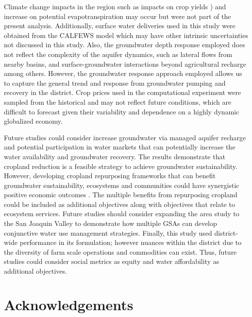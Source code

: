 \documentclass[a4paper,fleqn]{cas-sc}
\begin{document}
Climate change impacts in the region such as impacts on crop yields \citep{blanc_is_2017}) and increase on potential evapotranspiration \citep{mcevoy_projected_2020,vahmani_will_2022} may occur but were not part of the present analysis. Additionally, surface water deliveries used in this study were obtained from the CALFEWS model \citep{zeff_californias_2021} which may have other intrinsic uncertainties not discussed in this study. Also, the groundwater depth response employed does not reflect the complexity of the aquifer dynamics, such as lateral flows from nearby basins, and surface-groundwater interactions beyond agricultural recharge among others. However, the groundwater response approach employed allows us to capture the general trend and response from groundwater pumping and recovery in the district. Crop prices used in the computational experiment were sampled from the historical and may not reflect future conditions, which are difficult to forecast given their variability and dependence on a highly dynamic globalized economy. 

Future studies could consider increase groundwater via managed aquifer recharge \citep{alam_can_2020} and potential participation in water markets \citep{arellano-gonzalez_adaptive_2021,hanak_water_2019} that can potentially increase the water availability and groundwater recovery. The results demonstrate that cropland reduction is a feasible strategy to achieve groundwater sustainability. However, developing cropland repurposing frameworks that can benefit groundwater sustainability, ecosystems and communities could have synergistic positive economic outcomes \citep{biggs_landowner_2022,fernandez-bou_water_2023,espinoza_fallow_2023}. The multiple benefits from repurposing cropland could be included as additional objectives along with objectives that relate to ecosystem services. Future studies should consider expanding the area study to the San Joaquin Valley to demonstrate how multiple GSAs can develop conjunctive water use management strategies. Finally, this study used district-wide performance in its formulation; however nuances within the district due to the diversity of farm scale operations and commodities can exist. Thus, future studies could consider social metrics as equity and water affordability as additional objectives.  

\section*{Acknowledgements}
\end{document}
